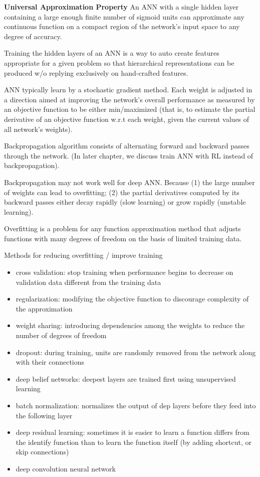 \documentclass[sutton_barto_notes.tex]{subfiles}
\begin{document}
\textbf{Universal Approximation Property} An ANN with a single hidden layer containing a large enough finite number of sigmoid units can approximate any continuous function on a compact region of the network's input space to any degree of accuracy.

Training the hidden layers of an ANN is a way to auto create features appropriate for a given problem so that hierarchical representations can be produced w/o replying exclusively on hand-crafted features.

ANN typically learn by a stochastic gradient method. Each weight is adjusted in a direction aimed at improving the network's overall performance as measured by an objective function to be either min/maximized (that is, to estimate the partial derivative of an objective function w.r.t each weight, given the current values of all network's weights).

Backpropagation algorithm consists of alternating forward and backward passes through the network. (In later chapter, we discuss train ANN with RL instead of backpropagation).

Backpropagation may not work well for deep ANN. Because (1) the large number of weights can lead to overfitting; (2) the partial derivatives computed by its backward passes either decay rapidly (slow learning) or grow rapidly (unstable learning).

Overfitting is a problem for any function approximation method that adjusts functions with many degrees of freedom on the basis of limited training data.

Methods for reducing overfitting / improve training
\begin{itemize}
\item cross validation: stop training when performance begins to decrease on validation data different from the training data
\item regularization: modifying the objective function to discourage complexity of the approximation
\item weight sharing: introducing dependencies among the weights to reduce the number of degrees of freedom
\item dropout: during training, units are randomly removed from the network along with their connections
\item deep belief networks: deepest layers are trained first using unsupervised learning
\item batch normalization: normalizes the output of dep layers before they feed into the following layer
\item deep residual learning: sometimes it is easier to learn a function differs from the identify function than to learn the function itself (by adding shortcut, or skip connections)
\item deep convolution neural network
\end{itemize}
\end{document}
